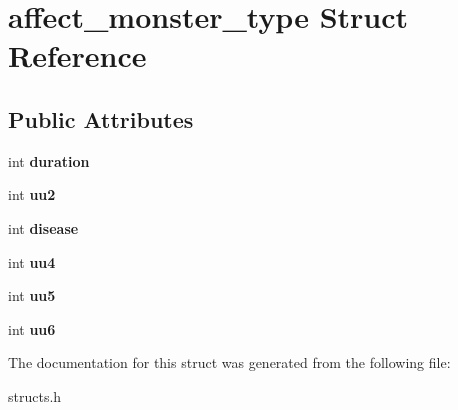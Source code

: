 \hypertarget{structaffect__monster__type}{\section{affect\-\_\-monster\-\_\-type Struct Reference}
\label{structaffect__monster__type}
}
\subsection*{Public Attributes}
\begin{DoxyCompactItemize}
\item 
\hypertarget{structaffect__monster__type_a001bc28584d7c48880a0820b3bc3565f}{int {\bfseries duration}}\label{structaffect__monster__type_a001bc28584d7c48880a0820b3bc3565f}

\item 
\hypertarget{structaffect__monster__type_aba6dd6a2b50d5b03a34a5b1d3af43314}{int {\bfseries uu2}}\label{structaffect__monster__type_aba6dd6a2b50d5b03a34a5b1d3af43314}

\item 
\hypertarget{structaffect__monster__type_abad9064f9415bf90b1e7b02bca2acae5}{int {\bfseries disease}}\label{structaffect__monster__type_abad9064f9415bf90b1e7b02bca2acae5}

\item 
\hypertarget{structaffect__monster__type_a7f70785dd18139e7b29a169759a17fec}{int {\bfseries uu4}}\label{structaffect__monster__type_a7f70785dd18139e7b29a169759a17fec}

\item 
\hypertarget{structaffect__monster__type_ab6ab151504902a754d408ac7fd873b42}{int {\bfseries uu5}}\label{structaffect__monster__type_ab6ab151504902a754d408ac7fd873b42}

\item 
\hypertarget{structaffect__monster__type_a08082a9e069912f4add89f125ae1e1e7}{int {\bfseries uu6}}\label{structaffect__monster__type_a08082a9e069912f4add89f125ae1e1e7}

\end{DoxyCompactItemize}


The documentation for this struct was generated from the following file\-:\begin{DoxyCompactItemize}
\item 
structs.\-h\end{DoxyCompactItemize}
